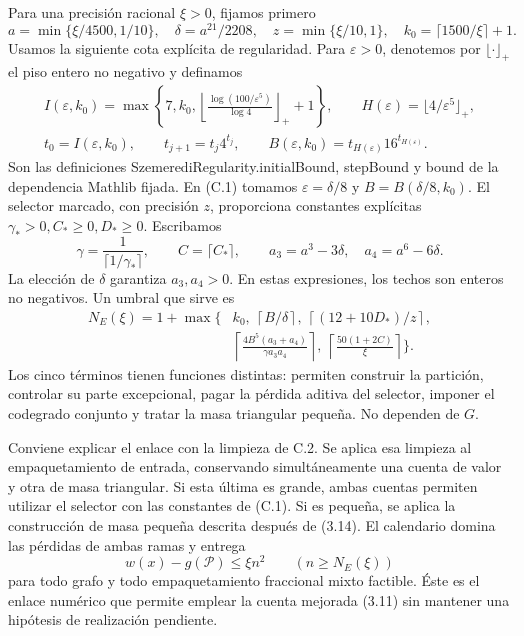 \documentclass[spanish,11pt,a4paper]{article}
\begin{document}
Para una precisión racional \(\xi>0\), fijamos primero \[
a=\min\{\xi/4500,1/10\},\quad
\delta=a^{21}/2208,\quad z=\min\{\xi/10,1\},\quad
k_0=\lceil1500/\xi\rceil+1.
\] Usamos la siguiente cota explícita de regularidad. Para \(\varepsilon>0\), denotemos por \(\lfloor\cdot\rfloor_+\) el piso entero no negativo y definamos \[
\begin{gathered}
I(\varepsilon,k_0)=\max\left\{7,k_0,
\left\lfloor\frac{\log(100/\varepsilon^5)}{\log4}\right\rfloor_++1\right\},
\qquad H(\varepsilon)=\lfloor4/\varepsilon^5\rfloor_+,\\
t_0=I(\varepsilon,k_0),\qquad t_{j+1}=t_j4^{t_j},\qquad
B(\varepsilon,k_0)=t_{H(\varepsilon)}16^{t_{H(\varepsilon)}}.
\end{gathered}
\] Son las definiciones {\ttfamily\small SzemerediReg\discretionary{\hbox{\ensuremath{\hookrightarrow}}}{}{}ularity.\discretionary{\hbox{\ensuremath{\hookrightarrow}}}{}{}initialBound}, {\ttfamily\small stepBound} y {\ttfamily\small bound} de la dependencia Mathlib fijada. En (C.1) tomamos \(\varepsilon=\delta/8\) y \(B=B(\delta/8,k_0)\). El selector marcado, con precisión \(z\), proporciona constantes explícitas \(\gamma_*>0,C_*\ge0,D_*\ge0\). Escribamos \[
\gamma=\frac1{\lceil1/\gamma_*\rceil},\qquad C=\lceil C_*\rceil,\qquad
a_3=a^3-3\delta,\quad a_4=a^6-6\delta.
\] La elección de \(\delta\) garantiza \(a_3,a_4>0\). En estas expresiones, los techos son enteros no negativos. Un umbral que sirve es \[
\begin{split}
N_E(\xi)=1+\max\biggl\{&
k_0,\ \left\lceil B/\delta\right\rceil,\
\left\lceil(12+10D_*)/z\right\rceil,\\
&\left\lceil\frac{4B^5(a_3+a_4)}{\gamma a_3a_4}\right\rceil,\
\left\lceil\frac{50(1+2C)}{\xi}\right\rceil
\biggr\}.
\end{split}
\tag{C.1}
\] Los cinco términos tienen funciones distintas: permiten construir la partición, controlar su parte excepcional, pagar la pérdida aditiva del selector, imponer el codegrado conjunto y tratar la masa triangular pequeña. No dependen de \(G\).

Conviene explicar el enlace con la limpieza de C.2. Se aplica esa limpieza al empaquetamiento de entrada, conservando simultáneamente una cuenta de valor y otra de masa triangular. Si esta última es grande, ambas cuentas permiten utilizar el selector con las constantes de (C.1). Si es pequeña, se aplica la construcción de masa pequeña descrita después de (3.14). El calendario domina las pérdidas de ambas ramas y entrega \[
w(x)-g(\mathcal P)\le\xi n^2
\qquad(n\ge N_E(\xi))
\tag{C.2}
\] para todo grafo y todo empaquetamiento fraccional mixto factible. Éste es el enlace numérico que permite emplear la cuenta mejorada (3.11) sin mantener una hipótesis de realización pendiente.
\end{document}
